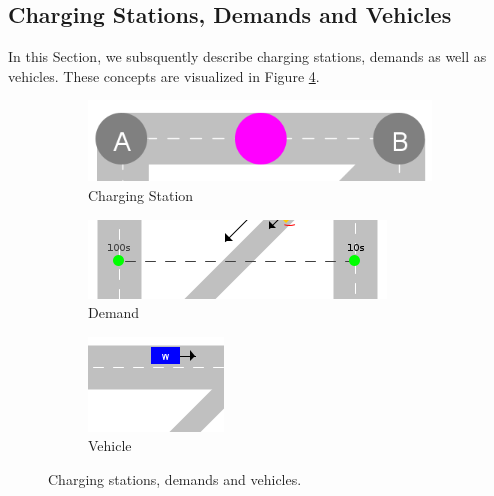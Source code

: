 \documentclass[graybox]{svmult}
\begin{document}
\noindent
\subsection{Charging Stations, Demands and Vehicles}
\label{sec:chargingstations-demands-vehicles}	
In this Section, we subsquently describe charging stations, demands as well as vehicles. These concepts are visualized in Figure \ref{fig:chargingstations-demands-vehicles}.
\begin{figure}
	\hfill
	\begin{subfigure}{.3\textwidth}
		\centering
		\includegraphics[scale=0.25]{../../concepts/charge-station.png}
		\caption{Charging Station}
		\label{fig:charging-station}	
	\end{subfigure}
	\hfill
	\begin{subfigure}{.3\textwidth}
		\centering
		\includegraphics[scale=0.4]{../../concepts/demand.png}
		\caption{Demand}
		\label{fig:demand}
	\end{subfigure}
	\hfill
	\begin{subfigure}{.3\textwidth}
		\centering
		\includegraphics[scale=0.6]{../../concepts/vehicle.png}
		\caption{Vehicle}
		\label{fig:vehicle}	
	\end{subfigure}

	\caption{Charging stations, demands and vehicles.}
	\label{fig:chargingstations-demands-vehicles}	
\end{figure}
\end{document}
